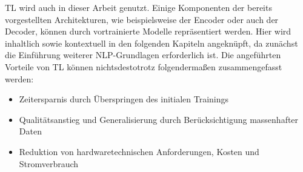 \noindent
\ac{TL} wird auch in dieser Arbeit genutzt. Einige Komponenten der bereits vorgestellten Architekturen, wie beispielsweise der Encoder oder auch der Decoder, können durch vortrainierte Modelle repräsentiert werden. Hier wird inhaltlich sowie kontextuell in den folgenden Kapiteln angeknüpft, da zunächst die Einführung weiterer \ac{NLP}-Grundlagen erforderlich ist. Die angeführten Vorteile von \ac{TL} können nichtsdestotrotz folgendermaßen zusammengefasst werden:

\begin{itemize}
	\item Zeitersparnis durch Überspringen des initialen Trainings
	\item Qualitätsanstieg und Generalisierung durch Berücksichtigung massenhafter Daten
	\item Reduktion von hardwaretechnischen Anforderungen, Kosten und Stromverbrauch
\end{itemize}
